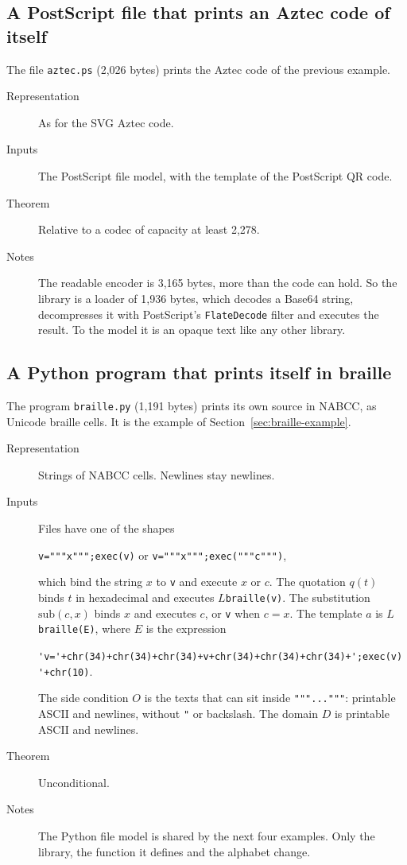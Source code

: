 \documentclass[11pt]{amsart}
\theoremstyle{definition}
\theoremstyle{remark}
\newcommand{\sub}{\mathrm{sub}}
\newcommand{\lean}[1]{\texttt{#1}}
\begin{document}
\subsection{A PostScript file that prints an Aztec code of itself}
The file \lean{aztec.ps} (2,026 bytes) prints the Aztec code of the previous example.
\begin{description}
\item[Representation] As for the SVG Aztec code.
\item[Inputs] The PostScript file model, with the template of the PostScript QR code.
\item[Theorem] Relative to a codec of capacity at least 2,278.
\item[Notes] The readable encoder is 3,165 bytes, more than the code can hold. So the library is a
loader of 1,936 bytes, which decodes a Base64 string, decompresses it with PostScript's
\verb|FlateDecode| filter and executes the result. To the model it is an opaque text like any
other library.
\end{description}

\subsection{A Python program that prints itself in braille}
The program \lean{braille.py} (1,191 bytes) prints its own source in NABCC, as Unicode braille
cells. It is the example of Section~\ref{sec:braille-example}.
\begin{description}
\item[Representation] Strings of NABCC cells. Newlines stay newlines.
\item[Inputs] Files have one of the shapes
\begin{center}
\verb|v="""x""";exec(v)| \quad or \quad \verb|v="""x""";exec("""c""")|,
\end{center}
which bind the string $x$ to \verb|v| and execute $x$ or $c$. The quotation $q(t)$ binds $t$
in hexadecimal and executes $L$\verb|braille(v)|. The substitution $\sub(c,x)$ binds $x$
and executes $c$, or \verb|v| when $c = x$. The template $a$ is $L$\verb|braille(E)|, where $E$ is
the expression
\begin{center}
\verb|'v='+chr(34)+chr(34)+chr(34)+v+chr(34)+chr(34)+chr(34)+';exec(v)'+chr(10)|.
\end{center}
The side condition $O$ is the texts that can sit inside \verb|"""..."""|: printable ASCII and
newlines, without \verb|"| or backslash. The domain $D$ is printable ASCII and newlines.
\item[Theorem] Unconditional.
\item[Notes] The Python file model is shared by the next four examples. Only the library, the
function it defines and the alphabet change.
\end{description}
\end{document}
